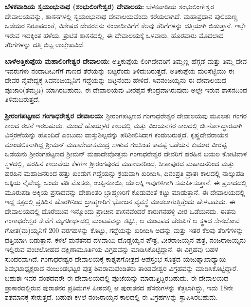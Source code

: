 \textbf{ಬೆಳಕವಾಡಿಯ ಸ್ವಯಂಭುನಾಥ (ಶಂಭುಲಿಂಗೇಶ್ವರ) ದೇವಾಲಯ:} ಬೆಳಕವಾಡಿಯ ಶಂಭುಲಿಂಗೇಶ್ವರ ದೇವಾಲಯವನ್ನು, ಶಾಸನಗಳಲ್ಲಿ ಸ್ವಯಂಭುನಾಥ ದೇವಾಲಯವೆಂದು ಕರೆಯಲಾಗಿದೆ. ಮಹಾಪ್ರಧಾನ ಪುಲಿಯಣ್ಣ ಒಡೆಯರ ನಿರೂಪದಂತೆ, ವಿಶೇಷದ ದೇವರಸನು ನಂದಾದೀವಿಗೆಗೆ ಕೆಲವು ತೆರಿಗೆಗಳನ್ನು ದತ್ತಿಯಾಗಿ ಬಿಡುತ್ತಾನೆ. ಇಲ್ಲೇ ಇರುವ ಇದಕ್ಕಿಂತ ಹಳೆಯ. ತ್ರುಟಿತ ಶಾಸನದಲ್ಲಿ, ಈ ದೇವಾಲಯಕ್ಕೆ ಒಳವಾರು, ಹೊರವಾರು ಮೊದಲಾದ ತೆರಿಗೆಗಳನ್ನು ದತ್ತಿ ಬಿಟ್ಟ ಉಲ್ಲೇಖವಿದೆ.

\textbf{ಬಾಳೆಅತ್ತಿಕುಪ್ಪೆಯ ಮಹಾಲಿಂಗೇಶ್ವರ ದೇವಾಲಯ:} ಅತ್ತಿಕುಪ್ಪೆಯ ಲಿಂಗದೇವರಿಗೆ ತಿಮ್ಮಣ್ಣ ಹೆಗ್ಗಡೆ ಮತ್ತು ತಿಮ್ಮ ದೇವ ಇವರುಗಳು ನಂದಾದೀವಿಗೆಗೆ ಗಾಣದ ತೆರೆಯನ್ನು ಬಿಟ್ಟರೆಂದು ತಿಳಿದುಬರುತ್ತದೆ. ಅತಿಕುಪ್ಪೆಯ ಮರಿಸೆಟ್ಟಿಯು ಈ ದೇವರ ನೈವೇದ್ಯಕ್ಕೆ ಸಿವನಂಜಯ್ಯನಿಗೆ ಗದ್ದೆಯನ್ನು ಬಿಟ್ಟನೆಂದು ಹೇಳಿದೆ. ಸಿವನಂಜಯ್ಯನು ಈ ದೇವಾಲಯದ ಪೂಜಾರಿ(ತಮ್ಮಡಿ) ಯಾಗಿರಬಹುದು. ಈ ದೇವಾಲಯವು ವೀರಶೈವ ಕೇಂದ್ರವಾಗಿರುವುದು ಅಲ್ಲೇ ಇರುವ ಶಾಸನದಿಂದ ತಿಳಿದುಬರುತ್ತದೆ.

\textbf{ಶ‍್ರೀರಂಗಪಟ್ಟಣದ ಗಂಗಾಧರೇಶ್ವರ ದೇವಾಲಯ:} ಶ‍್ರೀರಂಗಪಟ್ಟಣದ ಗಂಗಾಧರೇಶ್ವರ ದೇವಾಲಯವು ಮೂಲತಃ ಗಂಗರ ಕಾಲದ ರಚನೆ ಇರಬಹುದು. ಮುಂದೆ ಹೊಯ್ಸಳರ ಕಾಲದಲ್ಲಿ ಮತ್ತು ವಿಜಯನಗರ ಕಾಲದಲ್ಲಿ ಜೀರ್ಣೋದ್ಧಾರವಾಗಿ ವಿಸ್ತರಣೆಯನ್ನು ಹೊಂದಿದೆ ಎಂಬುದು ವಾಸ್ತುಶಿಲ್ಪವನ್ನು ಪರಿಶೀಲಿಸಿದಾಗ ಕಂಡುಬರುತ್ತದೆ. ಕೃಷ್ಣದೇವರಾಯನ ಮಾಂಡಲಿಕನಾಗಿದ್ದ ಶ‍್ರೀಮನ್​ ಮಹಾಸೇವಾಸಮುದ್ರ ಸಾಳುವ ಗಜಸಿಂಹ ಕಾವಪ್ಪ ಒಡೆಯನ ಕುಮಾರ ವೀರಪ್ಪ ಒಡೆಯನು ಶ‍್ರೀರಂಗಪಟ್ಟಣದ ಶ‍್ರೀಮನ್​ ಮಹಾದೇವೋತ್ತಮ ಗಂಗಾಧರೇಶ್ವರ ದೇವರಿಗೆ ಹರಹಿನ ಬಯಲ ಕೋಟಿವಾಳ ಸ್ಥಳದಲ್ಲಿ, ಹರಹಿನ ಕಾಲುವೆಯ ಕೆಳಗಣ ಶ‍್ರೀರಂಗಪುರದ ಮಹಾಜನರಿಂದ, ಸೀತಾಪುರದ ಮಹಾಜನರಿಂದ ಮತ್ತು ಹರಹಿನ ಮಹಾಜನರಿಂದ ಹತ್ತು ಖಂಡುಗ ಗದ್ದೆಯನ್ನು ಕ್ರಯವಾಗಿ ಖರೀದಿಸಿ, ದಿನಂಪ್ರತಿ ಪ್ರಾತಃ ಕಾಲದಲ್ಲಿ ನಾಲ್ಕುಪಡಿ ಅಕ್ಕಿಯ ನೈವೇದ್ಯ, ಒಂದು ಪಡಿ ಮೊಸರು, ಉಪ್ಪಿನಕಾಯಿ, ಯೇಲಕ್ಕಿ ಇವುಗಳಿಗಾಗಿ ಸಮರ್ಪಿಸುತ್ತಾನೆ. ಈ ಪ್ರಸಾದದಲ್ಲಿ ಮೂರುಪಡಿ ಅಕ್ಕಿಯ ಪ್ರಸಾದವನ್ನು ದೇಶಾಂತರಿ ಬ್ರಾಹ್ಮಣರಿಗೆ ಕೊಡುವಂತೆ ಕಟ್ಟು ಮಾಡುತ್ತಾನೆ. ಈ ದೇವಾಲಯದಲ್ಲಿ ಇದ್ದ ಸತ್ರದಲ್ಲಿ ಪ್ರತಿದಿನ ಹೊರಗಿನಿಂದ ಬ್ರಾಹ್ಮಣರಿಗೆ ಭೋಜನ ವ್ಯವಸ್ಥೆ ಮಾಡಲಾಗುತ್ತಿತ್ತೆಂದು ಹೇಳಬಹುದು. ಈ ದೇವಾಲಯದಲ್ಲಿ ದೊರೆಯುವ ಇನ್ನೊಂದು ಪ್ರಾಚೀನ ಶಾಸನವೆಂದರೆ ಕಾರುಗನಹಳ್ಳಿ ವೀರ ಒಡೆಯನದು. ಈತನು ಗಂಗಾಧರೇಶ್ವರ ಸೇವೆಗೆ ಮೃಗತೀರ್ಥದಲ್ಲಿ ಮಂಟಪವನ್ನು ಕಟ್ಟಿಸಿ, ಆ ಮಂಟಪದ ಚೆರುಪಿಗೆ ಆ ಸ್ಥಳದ ಸೇನಬೋವ ಗೋತ(ಮ)ಯ್ಯನಿಗೆ 200 ವರಗಹಳನ್ನು ಕೊಟ್ಟು, ಗದ್ದೆಯನ್ನು ಖರೀದಿಸಿ ಅದನ್ನು ಮತ್ತು ಇತರ ಕೆಲವು ತೆರಿಗೆಗಳನ್ನು ದತ್ತಿಯಾಗಿ ಬಿಡುತ್ತಾನೆ. ಕಳಲೆ ಮನೆತನದ ದಳವಾಯಿ ದೊಡ್ಡಯ್ಯನ ಪೌತ್ರ, ವೀರರಾಜಯ್ಯನ ಪುತ್ರ, ನಂಜರಾಜಯ್ಯನು ಇಲ್ಲಿರುವ ಪಂಚಲೋಹದ ದಕ್ಷಿಣಾಮೂರ್ತಿಯ ವಿಗ್ರಹವನ್ನು ಮಾಡಿಸಿಕೊಟ್ಟಿದ್ದಾನೆ. ಈ ವಿಗ್ರಹವು ಬಹಳ ಸುಂದರವಾಗಿದೆ. ಗಂಗಾಧರೇಶ್ವರ ದೇವಾಲಯಕ್ಕೆ ಕಾಶ್ಯಪಗೋತ್ರದ ಆಪಸ್ತಂಭ ಸೂತ್ರದ ಯಜುಶ್ಶಾಖಾಧ್ಯಾಯಿ ಶಿವಭಟಾಧ್ಯಕ್ಷರಾದ ನಂಜುಂಡಭಟ್ಟರ ಪುತ್ರ ಶಿವರಾಮಪಂಡಿತರು ತಾಂಡವೇಶ್ವರ ವಿಗ್ರಹವನ್ನು ಮಾಡಿಸಿಕೊಟ್ಟಿದ್ದಾರೆ. ಬಹುಶಃ ಇವರ ವಂಶದವರೇ ಈ ದೇವಾಲಯದಲ್ಲಿ ಪೂಜೆಯನ್ನು ಮಾಡುತ್ತಿದ್ದಿರಬಹುದು. ಈ ದೇವಾಲಯದ ಪ್ರಾಕಾರದಲ್ಲಿರುವ ಪುರಾತನರ ಪ್ರತಿಮೆಗಳ ಪೀಠದಲ್ಲಿ ಆ ಪುರಾತನದ ಹೆಸರುಗಳನ್ನು ಕೆತ್ತಲಾಗಿದ್ದು, ಇದು 18ನೇ ಶತಮಾನಕ್ಕೆ ಸೇರುತ್ತದೆ. ಬಹುಶಃ ಕಳಲೆ ನಂಜರಾಯ್ಯನ ಕಾಲದಲ್ಲಿ ಈ ವಿಗ್ರಹಗಳನ್ನು ಸ್ಥಾಪಿಸಿರಬಹುದು.

